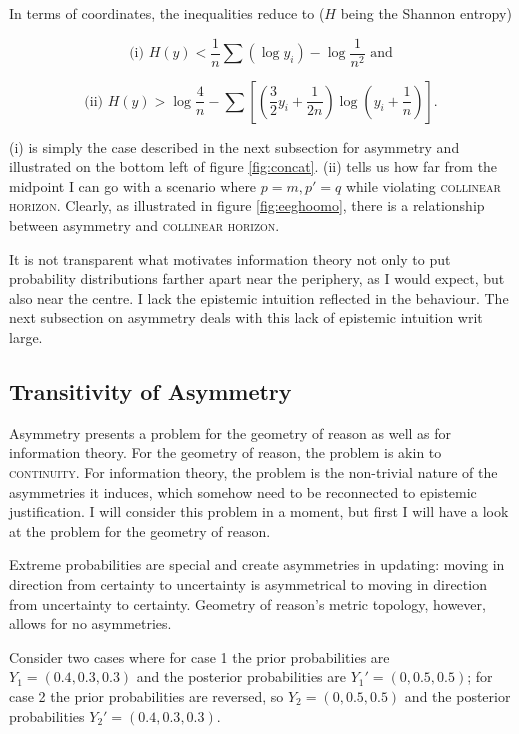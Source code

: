 \documentclass[12pt]{article}
\begin{document}
In terms of coordinates, the inequalities reduce to ($H$ being the
Shannon entropy)

\begin{equation}
  \label{eq:iengaech}
\mbox{(i) }H(y)<\frac{1}{n}\sum\left(\log{}y_{i}\right)-\log\frac{1}{n^{2}}\mbox{ and}
\end{equation}

\begin{equation}
  \label{eq:feovaivo}
\mbox{(ii) }H(y)>\log\frac{4}{n}-\sum\left[\left(\frac{3}{2}y_{i}+\frac{1}{2n}\right)\log\left(y_{i}+\frac{1}{n}\right)\right].
\end{equation}

(i) is simply the case described in the next subsection for asymmetry
and illustrated on the bottom left of figure \ref{fig:concat}. (ii)
tells us how far from the midpoint I can go with a scenario where
$p=m,p'=q$ while violating \textsc{collinear horizon}. Clearly, as
illustrated in figure \ref{fig:eeghoomo}, there is a relationship
between asymmetry and \textsc{collinear horizon}. 

It is not transparent what motivates information theory not only to
put probability distributions farther apart near the periphery, as I
would expect, but also near the centre. I lack the epistemic intuition
reflected in the behaviour. The next subsection on asymmetry deals
with this lack of epistemic intuition writ large.

\subsection{Transitivity of Asymmetry}
\label{subsec:Asymmetry}

Asymmetry presents a problem for the geometry of reason as well as for
information theory. For the geometry of reason, the problem is akin to
\textsc{continuity}. For information theory, the problem is the
non-trivial nature of the asymmetries it induces, which somehow need
to be reconnected to epistemic justification. I will consider this
problem in a moment, but first I will have a look at the problem for
the geometry of reason.

Extreme probabilities are special and create asymmetries in updating:
moving in direction from certainty to uncertainty is asymmetrical to
moving in direction from uncertainty to certainty. Geometry of
reason's metric topology, however, allows for no asymmetries.

\begin{quotex}
  \label{ex:extreme} Consider two cases
  where for case 1 the prior probabilities are $Y_{1}=(0.4,0.3,0.3)$
  and the posterior probabilities are $Y_{1}'=(0,0.5,0.5)$; for case 2
  the prior probabilities are reversed, so $Y_{2}=(0,0.5,0.5)$ and the
  posterior probabilities $Y_{2}'=(0.4,0.3,0.3)$.
\end{quotex}
\end{document}
